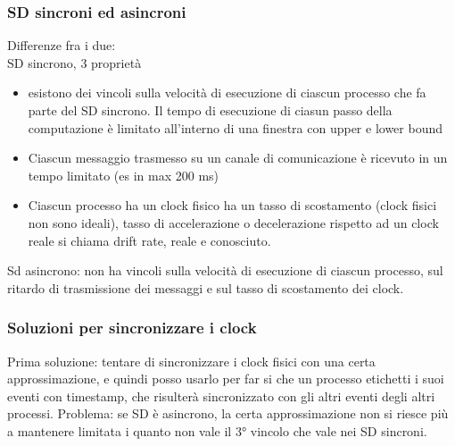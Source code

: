 \documentclass[16px]{article}
\begin{document}
\subsubsection{SD sincroni ed asincroni}
Differenze fra i due:\\
SD sincrono, 3 proprietà
\begin{itemize}
\item esistono dei vincoli sulla velocità di esecuzione di ciascun processo che fa parte del SD sincrono. Il tempo di esecuzione di ciasun passo della computazione è limitato all'interno di una finestra con upper e lower bound
\item Ciascun messaggio trasmesso su un canale di comunicazione è ricevuto in un tempo limitato (es in max 200 ms)
\item Ciascun processo ha un clock fisico ha un tasso di scostamento (clock fisici non sono ideali), tasso di accelerazione  o decelerazione rispetto ad un clock reale si chiama drift rate, reale e conosciuto.
\end{itemize}
Sd asincrono: non ha vincoli sulla velocità di esecuzione di ciascun processo, sul ritardo di trasmissione dei messaggi e sul tasso di scostamento dei clock.
\subsubsection{Soluzioni per sincronizzare i clock}
Prima soluzione: tentare di sincronizzare i clock fisici con una certa approssimazione, e quindi posso usarlo per far si che un processo etichetti i suoi eventi con timestamp, che risulterà sincronizzato con gli altri eventi degli altri processi. Problema: se SD è asincrono, la certa approssimazione non si riesce più a mantenere limitata i quanto non vale il 3° vincolo che vale nei SD sincroni.
\end{document}
